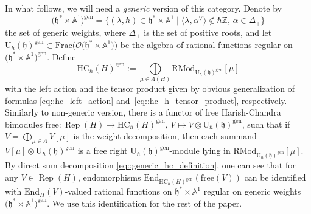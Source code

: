 \documentclass[10pt,a4paper]{article}
\numberwithin{equation}{section}
\newcommand{\cO}{\mathcal{O}}
\newcommand{\U}{\mathrm{U}_{\hbar}}
\newcommand{\h}{\mathfrak{h}}
\newcommand{\End}{\mathrm{End}}
\newcommand{\Frac}{\mathrm{Frac}}
\newcommand{\free}{\mathrm{free}}
\newcommand{\gen}{\mathrm{gen}}
\newcommand{\HC}{\mathrm{HC}_{\hbar}}
\newcommand{\RMod}{\mathrm{RMod}}
\DeclareMathOperator{\Rep}{Rep}
\begin{document}
	In what follows, we will need a \emph{generic} version of this category. Denote by
	\begin{equation}
		\label{eq::generic_weights}
		\bigl(\h^* \times \mathbb{A}^1\bigr)^{\gen} = \bigl\{(\lambda,\hbar) \in \h^* \times \mathbb{A}^1 \mid \bigl\langle \lambda, \alpha^{\vee} \bigr\rangle \not\in \hbar \mathbb{Z},\, \alpha \in \Delta_+\bigr\}
	\end{equation}
	the set of generic weights, where $\Delta_+$ is the set of positive roots, and let $\U(\h)^{\gen} \subset \Frac\bigl(\cO\bigl(\h^* \times \mathbb{A}^1\bigr)\bigr)$ be the algebra of rational functions regular on $\bigl(\h^* \times \mathbb{A}^1\bigr)^{\gen}$. Define
	\begin{equation}
		\label{eq::generic_hc_definition}
		\HC(H)^{\gen} := \bigoplus\limits_{\mu\in \Lambda(H)} \RMod_{\U(\h)^{\gen}} [\mu]
	\end{equation}
	with the left action and the tensor product given by obvious generalization of formulas \eqref{eq::hc_left_action} and~\eqref{eq::hc_h_tensor_product}, respectively. Similarly to non-generic version, there is a functor of free Harish-Chandra bimodules
$
	\free\colon \Rep(H) \rightarrow \HC(H)^{\gen}$, $ V \mapsto V \otimes \U(\h)^{\gen}$,
	such that if $V = \bigoplus_{\mu\in \Lambda} V[\mu]$ is the weight decomposition, then each summand $V[\mu] \otimes \U(\h)^{\gen}$ is a free right $\U(\h)^{\gen}$-module lying in $\RMod_{\U(\h)^{\gen}}[\mu]$. By direct sum decomposition \eqref{eq::generic_hc_definition}, one can see that for any $V\in \Rep(H)$, endomorphisms $\End_{\HC(H)^{\gen}} (\free(V))$ can be identified with $\End_H(V)$-valued rational functions on $\h^* \times \mathbb{A}^1$ regular on generic weights $\bigl(\h^* \times \mathbb{A}^1\bigr)^{\gen}$. We use this identification for the rest of the paper.
	
\end{document}
